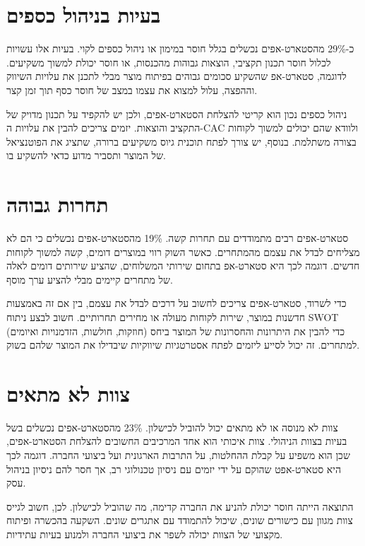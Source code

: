 \section{בעיות בניהול כספים}

כ-29\% מהסטארט-אפים נכשלים בגלל חוסר במימון או ניהול כספים לקוי. בעיות אלו עשויות לכלול חוסר תכנון תקציבי, הוצאות גבוהות מהכנסות, או חוסר יכולת למשוך משקיעים. לדוגמה, סטארט-אפ שהשקיע סכומים גבוהים בפיתוח מוצר מבלי לתכנן את עלויות השיווק וההפצה, עלול למצוא את עצמו במצב של חוסר כסף תוך זמן קצר.

ניהול כספים נכון הוא קריטי להצלחת הסטארט-אפים, ולכן יש להקפיד על תכנון מדויק של התקציב והוצאות. יזמים צריכים להבין את עלויות ה-CAC  ולוודא שהם יכולים למשוך לקוחות בצורה משתלמת. בנוסף, יש צורך לפתח תוכנית גיוס משקיעים ברורה, שתציג את הפוטנציאל של המוצר ותסביר מדוע כדאי להשקיע בו.

\section{תחרות גבוהה}

סטארט-אפים רבים מתמודדים עם תחרות קשה. 19\% מהסטארט-אפים נכשלים כי הם לא מצליחים לבדל את עצמם מהמתחרים. כאשר השוק רווי במוצרים דומים, קשה למשוך לקוחות חדשים. דוגמה לכך היא סטארט-אפ בתחום שירותי המשלוחים, שהציע שירותים דומים לאלה של מתחרים קיימים מבלי להציע ערך מוסף.

כדי לשרוד, סטארט-אפים צריכים לחשוב על דרכים לבדל את עצמם, בין אם זה באמצעות חדשנות במוצר, שירות לקוחות מעולה או מחירים תחרותיים. חשוב לבצע ניתוח SWOT (חוזקות, חולשות, הזדמנויות ואיומים) כדי להבין את היתרונות והחסרונות של המוצר ביחס למתחרים. זה יכול לסייע ליזמים לפתח אסטרטגיות שיווקיות שיבדילו את המוצר שלהם בשוק.

\section{צוות לא מתאים}

צוות לא מנוסה או לא מתאים יכול להוביל לכישלון. 23\% מהסטארט-אפים נכשלים בשל בעיות בצוות הניהולי. צוות איכותי הוא אחד המרכיבים החשובים להצלחת הסטארט-אפים, שכן הוא משפיע על קבלת ההחלטות, על התרבות הארגונית ועל ביצועי החברה. דוגמה לכך היא סטארט-אפט שהוקם על ידי יזמים עם ניסיון טכנולוגי רב, אך חסר להם ניסיון בניהול עסק.

התוצאה הייתה חוסר יכולת להניע את החברה קדימה, מה שהוביל לכישלון. לכן, חשוב לגייס צוות מגוון עם כישורים שונים, שיכול להתמודד עם אתגרים שונים. השקעה בהכשרה ופיתוח מקצועי של הצוות יכולה לשפר את ביצועי החברה ולמנוע בעיות עתידיות.


